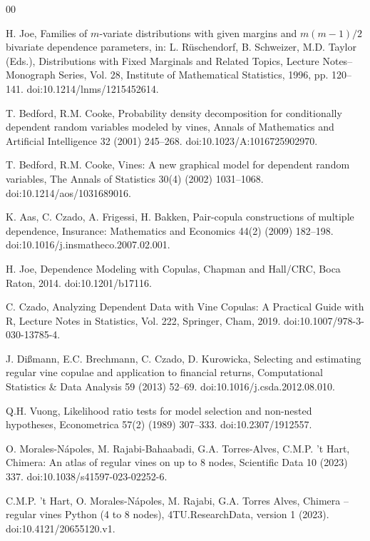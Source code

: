 \documentclass[preprint,12pt, a4paper]{elsarticle}
\begin{document}
\begin{thebibliography}{00}

H. Joe, Families of $m$-variate distributions with given margins and
$m(m-1)/2$ bivariate dependence parameters, in: L. R{\"u}schendorf,
B. Schweizer, M.D. Taylor (Eds.), Distributions with Fixed Marginals and
Related Topics, Lecture Notes--Monograph Series, Vol. 28, Institute of
Mathematical Statistics, 1996, pp. 120--141.
doi:10.1214/lnms/1215452614.

T. Bedford, R.M. Cooke, Probability density decomposition for conditionally
dependent random variables modeled by vines, Annals of Mathematics and
Artificial Intelligence 32 (2001) 245--268.
doi:10.1023/A:1016725902970.

T. Bedford, R.M. Cooke, Vines: A new graphical model for dependent random
variables, The Annals of Statistics 30(4) (2002) 1031--1068.
doi:10.1214/aos/1031689016.

K. Aas, C. Czado, A. Frigessi, H. Bakken, Pair-copula constructions of
multiple dependence, Insurance: Mathematics and Economics 44(2) (2009)
182--198. doi:10.1016/j.insmatheco.2007.02.001.

H. Joe, Dependence Modeling with Copulas, Chapman and Hall/CRC, Boca Raton,
2014. doi:10.1201/b17116.

C. Czado, Analyzing Dependent Data with Vine Copulas: A Practical Guide with R,
Lecture Notes in Statistics, Vol. 222, Springer, Cham, 2019.
doi:10.1007/978-3-030-13785-4.

J. Di{\ss}mann, E.C. Brechmann, C. Czado, D. Kurowicka, Selecting and
estimating regular vine copulae and application to financial returns,
Computational Statistics \& Data Analysis 59 (2013) 52--69.
doi:10.1016/j.csda.2012.08.010.

Q.H. Vuong, Likelihood ratio tests for model selection and non-nested
hypotheses, Econometrica 57(2) (1989) 307--333.
doi:10.2307/1912557.

O. Morales-N{\'a}poles, M. Rajabi-Bahaabadi, G.A. Torres-Alves,
C.M.P. {'t} Hart, Chimera: An atlas of regular vines on up to 8 nodes,
Scientific Data 10 (2023) 337. doi:10.1038/s41597-023-02252-6.

C.M.P. {'t} Hart, O. Morales-N{\'a}poles, M. Rajabi, G.A. Torres Alves,
Chimera -- regular vines Python (4 to 8 nodes), 4TU.ResearchData, version 1
(2023). doi:10.4121/20655120.v1.


\end{thebibliography}
\end{document}
